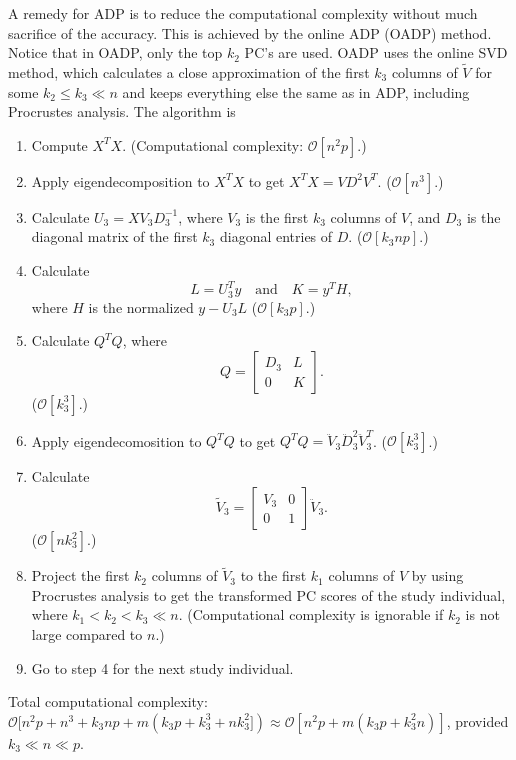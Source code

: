 \documentclass{article}
\newcommand{\bO}{\mathcal{O}}
\begin{document}
A remedy for ADP is to reduce the computational complexity without much sacrifice of the accuracy.
This is achieved by the online ADP (OADP) method.
Notice that in OADP, only the top $k_2$ PC's are used.
OADP uses the online SVD method, which calculates a close approximation of the first $k_3$ columns of $\tilde{V}$ for some $k_2 \leq k_3 \ll n$ and keeps everything else the same as in ADP, including Procrustes analysis. 
The algorithm is
\begin{enumerate}
\item Compute $X^T X$.
  (Computational complexity: $\bO[n^2p]$.)  
\item Apply eigendecomposition to $X^T X$ to get $X^T X = V D^2 V^T$.
  ($\bO[n^3]$.)
\item Calculate $U_3 = X V_3 D_3^{-1}$,
  where $V_3$ is the first $k_3$ columns of $V$,
  and $D_3$ is the diagonal matrix of the first $k_3$ diagonal entries of $D$.
  ($\bO[k_3 n p]$.)
\item Calculate 
  \[
    L = U_3^T y \quad \text{and} \quad K = y^T H,
  \]
  where $H$ is the normalized  $y - U_3L$
  ($\bO[k_3 p]$.)
\item Calculate $Q^T Q$, where
  \[
    Q = 
    \begin{bmatrix}
      D_3 & L \\
      0 & K
    \end{bmatrix}.
  \]
  ($\bO[k_3^3]$.)
\item Apply eigendecomosition to $Q^T Q$ to get $Q^T Q = \ddot{V}_3 \ddot{D}^2_3 \ddot{V}^T_3$.
  ($\bO[k_3^3]$.)
\item Calculate
  \[
    \tilde{V}_3 =
    \begin{bmatrix}
      V_3 & 0 \\
      0 & 1
    \end{bmatrix}
    \ddot{V}_3.
  \]
  ($\bO[nk_3^2]$.)
\item Project the first $k_2$ columns of $\tilde{V}_3$ to the first $k_1$ columns of $V$ by using Procrustes analysis to get the transformed PC scores of the study individual,
  where $k_1 < k_2  < k_3 \ll n$.
  (Computational complexity is ignorable if $k_2$ is not large compared to $n$.)
  \item Go to step 4 for the next study individual.
\end{enumerate}

Total computational complexity: $\bO[n^2p + n^3 + k_3np + m(k_3p + k_3^3 + nk_3^2]) \approx \bO[n^2p + m(k_3p + k_3^2n)]$, provided $k_3 \ll n \ll p$.
\end{document}
